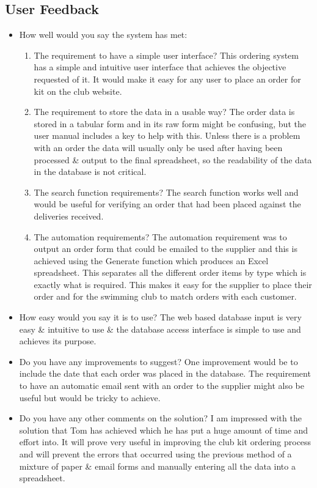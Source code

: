 \documentclass[
11pt, %
a4paper, %
oneside, %
headinclude,footinclude, %
BCOR5mm, %
]{scrartcl}
\begin{document}
\subsection{User Feedback}
\begin{itemize}
	\item How well would you say the system has met:\begin{enumerate}
		\item The requirement to have a simple user interface? This ordering system has a simple and intuitive user interface that achieves the objective requested of it. It would make it easy for any user to place an order for kit on the club website.
		\item The requirement to store the data in a usable way? The order data is stored in a tabular form and in its raw form might be confusing, but the user manual includes a key to help with this. Unless there is a problem with an order the data will usually only be used after having been processed & output to the final spreadsheet, so the readability of the data in the database is not critical.
		\item The search function requirements? The search function works well and would be useful for verifying an order that had been placed against the deliveries received.
		\item The automation requirements? The automation requirement was to output an order form that could be emailed to the supplier and this is achieved using the Generate function which produces an Excel spreadsheet. This separates all the different order items by type which is exactly what is required. This makes it easy for the supplier to place their order and for the swimming club to match orders with each customer.
	\end{enumerate}
	\item How easy would you say it is to use? The web based database input is very easy & intuitive to use & the database access interface is simple to use and achieves its purpose.
	\item Do you have any improvements to suggest? One improvement would be to include the date that each order was placed in the database. The requirement to have an automatic email sent with an order to the supplier might also be useful but would be tricky to achieve.
	\item Do you have any other comments on the solution? I am impressed with the solution that Tom has achieved which he has put a huge amount of time and effort into. It will prove very useful in improving the club kit ordering process and will prevent the errors that occurred using the previous method of a mixture of paper & email forms and manually entering all the data into a spreadsheet.
\end{itemize}
\end{document}
